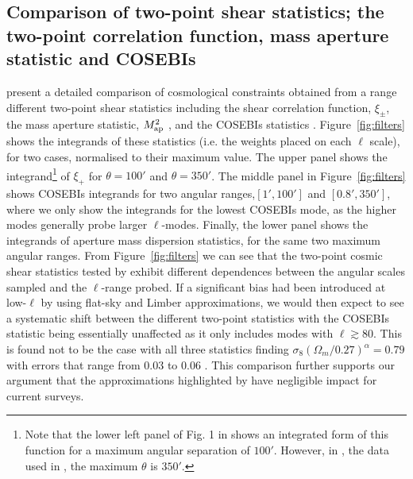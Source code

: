 \subsection{Comparison of two-point shear statistics; the two-point correlation function, mass aperture statistic and COSEBIs}
\citet{kilbinger/etal:2013} present a detailed comparison of cosmological constraints obtained from a range different two-point shear statistics including the shear correlation function, $\xi_\pm$, the mass aperture statistic, $M_ {\rm ap}^2$ \citep{schneider/etal:1998}, and the COSEBIs statistics \citep{schneider/etal:2010}.  Figure~\ref{fig:filters} shows the integrands of these statistics (i.e. the weights placed on each $\ell$ scale),  for two cases, normalised to their maximum value.  The upper panel shows the integrand\footnote{Note that the lower left panel of Fig. 1 in \citet{kitching/etal:2016} shows an integrated form of this function for a maximum
angular separation of $100'$. However, in \citet{kilbinger/etal:2013}, the data used in \citet{kitching/etal:2016}, 
the maximum $\theta$ is $350'$.} of $\xi_+$ for $\theta=100'$ and $\theta=350'$. The middle panel in Figure~\ref{fig:filters} shows COSEBIs integrands for two angular ranges,$[1',100']$ and $[0.8',350']$, where we only show the integrands for the lowest COSEBIs mode, as the higher modes generally probe larger $\ell$-modes.  Finally, the lower panel shows the integrands of aperture mass dispersion statistics, for the same two maximum angular ranges.
From Figure~\ref{fig:filters} we can see that the two-point cosmic shear statistics tested by \citet{kilbinger/etal:2013} exhibit different dependences between the angular scales sampled and the $\ell$-range probed.   
If a significant bias had been introduced at low-$\ell$ by using flat-sky and Limber approximations, we would then expect to see a systematic shift between the different two-point statistics with the COSEBIs statistic being essentially unaffected as it only includes modes with $\ell \gtrsim 80$.  This is found not to be the case with all three statistics finding $\sigma_8 (\Omega_m/0.27)^\alpha = 0.79$ with errors that range from $0.03$ to $0.06$ \citep[see Table 5 of][]{kilbinger/etal:2013}.  This comparison further supports our argument that the approximations highlighted by \citet{kitching/etal:2016} have negligible impact for current surveys.

